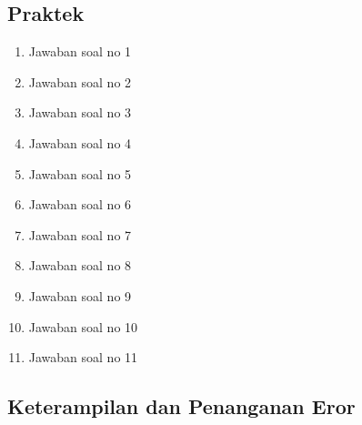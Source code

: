 \subsection{Praktek}
\begin{enumerate}
	\item Jawaban soal no 1
	
	\item Jawaban soal no 2
	
	\item Jawaban soal no 3
	
	\item Jawaban soal no 4
	
	\item Jawaban soal no 5
	
	\item Jawaban soal no 6
	
	\item Jawaban soal no 7
	
	\item Jawaban soal no 8
	
	\item Jawaban soal no 9
	
	\item Jawaban soal no 10
	
	\item Jawaban soal no 11
	
\end{enumerate}

\subsection{Keterampilan dan Penanganan Eror}
	

